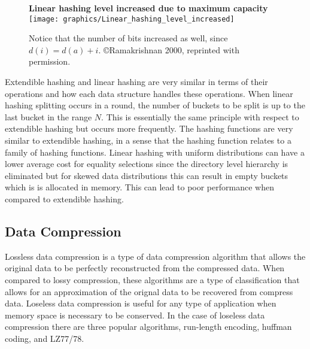 \documentclass[letterpaper, 12pt]{article}
\begin{document}
\begin{figure}
  \centering
  \textbf{Linear hashing level increased due to maximum capacity}
  \texttt{[image: graphics/Linear\_hashing\_level\_increased]}
  \caption{Notice that the number of bits increased as well, since $d(i) = d(a) + i$.  \copyright Ramakrishnan 2000, reprinted with permission.\cite{ramakrishnan2000database}}
  \label{fig:linear_hash_level_inc}
\end{figure}

Extendible hashing and linear hashing are very similar in terms of their operations and 
how each data structure handles these operations. When linear hashing splitting occurs in a round, the 
number of buckets to be split is up to the last bucket in the range $N$. This is essentially the same 
principle with respect to extendible hashing but occurs more frequently. The hashing functions are 
very similar to extendible hashing, in a sense that the hashing function relates to a family of 
hashing functions. Linear hashing with uniform distributions can have a lower average cost for 
equality selections since the directory level hierarchy is eliminated but for skewed data 
distributions this can result in empty buckets which is is allocated in memory. This can lead 
to poor performance when compared to extendible hashing.

\subsection{Data Compression}
Lossless data compression is a type of data compression algorithm that allows
the original data to be perfectly reconstructed from the compressed data. When
compared to lossy compression, these algorithms are a type of classification that
allows for an approximation of the orignal data to be recovered from compress data.
Loseless data compression is useful for any type of application when memory space is
necessary to be conserved. In the case of loseless data compression there are three
popular algorithms, run-length encoding, huffman coding, and LZ77/78.
\par\vspace{\baselineskip}
\end{document}
